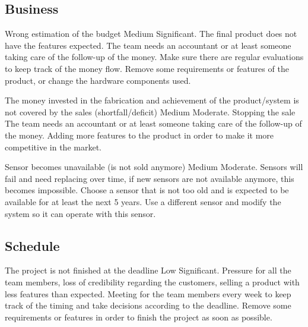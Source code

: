 \subsection{Business}

{Wrong estimation of the budget}
{Medium}
{Significant. The final product does not have the features expected.}
{The team needs an accountant or at least someone taking care of the follow-up of the money. Make sure there are regular evaluations to keep track of the money flow.}
{Remove some requirements or features of the product, or change the hardware components used.}

{The money invested in the fabrication and achievement of the product/system is not covered by the sales (shortfall/deficit)}
{Medium}
{Moderate. Stopping the sale}
{The team needs an accountant or at least someone taking care of the follow-up of the money.}
{Adding more features to the product in order to make it more competitive in the market.}

	
{Sensor becomes unavailable (is not sold anymore)}
{Medium}
{Moderate. Sensors will fail and need replacing over time, if new sensors are not available anymore, this becomes impossible.}
{ Choose a sensor that is not too old and is expected to be available for at least the next 5 years. }
{ Use a different sensor and modify the system so it can operate with this sensor. }	



\subsection{Schedule}
{The project is not finished at the deadline}
{Low}
{Significant. Pressure for all the team members, loss of credibility regarding the customers, selling a product with less features than expected.}
{ Meeting for the team members every week to keep track of the timing and take decisions according to the deadline. }
{ Remove some requirements or features in order to finish the project as soon as possible. }